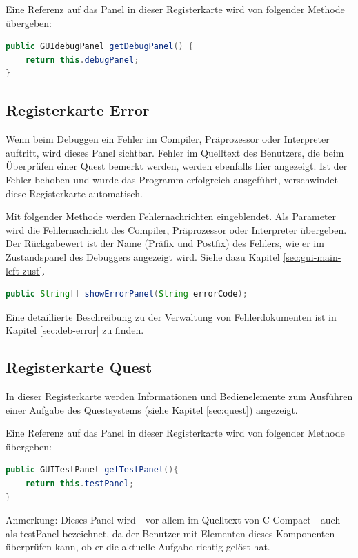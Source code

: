 Eine Referenz auf das Panel in dieser Registerkarte wird von folgender Methode übergeben:
\begin{lstlisting}[language=JAVA]
public GUIdebugPanel getDebugPanel() {
	return this.debugPanel;
}
\end{lstlisting}

\subsection{Registerkarte \glqq{}Error\grqq{}}
\label{sec:gui-main-right-error}
Wenn beim Debuggen ein Fehler im Compiler, Präprozessor oder Interpreter auftritt, wird dieses Panel sichtbar. Fehler im Quelltext des Benutzers, die beim Überprüfen einer Quest bemerkt werden, werden ebenfalls hier angezeigt. Ist der Fehler behoben und wurde das Programm erfolgreich ausgeführt, verschwindet diese Registerkarte automatisch.

Mit folgender Methode werden Fehlernachrichten eingeblendet. Als Parameter wird die Fehlernachricht des Compiler, Präprozessor oder Interpreter übergeben. Der Rückgabewert ist der Name (Präfix und Postfix) des Fehlers, wie er im Zustandspanel des Debuggers angezeigt wird. Siehe dazu Kapitel \ref{sec:gui-main-left-zust}.
\begin{lstlisting}[language=JAVA]
public String[] showErrorPanel(String errorCode);
\end{lstlisting}

Eine detaillierte Beschreibung zu der Verwaltung von Fehlerdokumenten ist in Kapitel \ref{sec:deb-error} zu finden.

\subsection{Registerkarte \glqq{}Quest\grqq{}}
In dieser Registerkarte werden Informationen und Bedienelemente zum Ausführen einer Aufgabe des Questsystems (siehe Kapitel \ref{sec:quest}) angezeigt.

Eine Referenz auf das Panel in dieser Registerkarte wird von folgender Methode übergeben:
\begin{lstlisting}[language=JAVA]
public GUITestPanel getTestPanel(){
	return this.testPanel;
}
\end{lstlisting}

Anmerkung: Dieses Panel wird - vor allem im Quelltext von C Compact - auch als \glqq{}testPanel\grqq{} bezeichnet, da der Benutzer mit Elementen dieses Komponenten überprüfen kann, ob er die aktuelle Aufgabe richtig gelöst hat.

